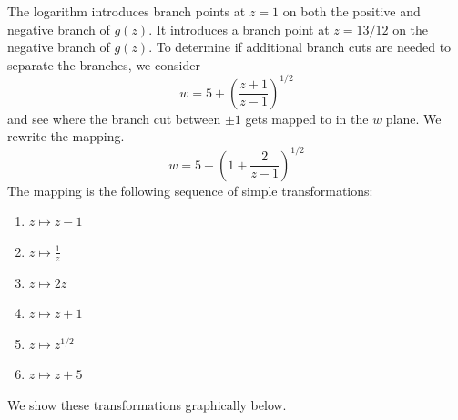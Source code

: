 {\begin{Solution}
\begin{enumerate}

    The logarithm introduces branch points at $z = 1$ on both the positive and
    negative branch of $g(z)$.  It introduces a branch point at $z = 13/12$ on
    the negative branch of $g(z)$.  To determine if additional branch cuts are
    needed to separate the branches, we consider 
    \[
    w = 5 + \left( \frac{z+1}{z-1} \right)^{1/2}
    \]
    and see where the branch cut
    between $\pm 1$ gets mapped to in the $w$ plane.  We rewrite the mapping.
    \[
    w = 5 + \left( 1 + \frac{2}{z-1} \right)^{1/2}
    \]
    The mapping is the following sequence of simple transformations:
    \begin{enumerate}
    \item $z \mapsto z - 1$
    \item $\displaystyle z \mapsto \frac{1}{z}$
    \item $z \mapsto 2 z$
    \item $z \mapsto z + 1$
    \item $\displaystyle z \mapsto z^{1/2}$
    \item $z \mapsto z + 5$
    \end{enumerate}
    We show these transformations graphically below.


\end{enumerate}
\end{Solution}}
